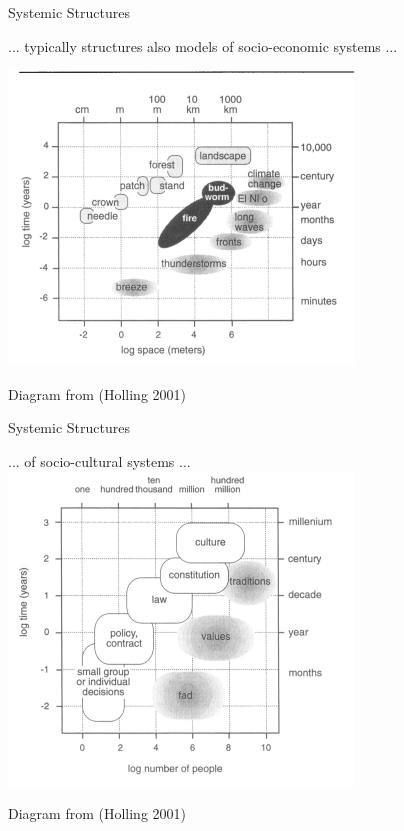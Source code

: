 \documentclass{beamer}
\begin{document}
\begin{frame}{Systemic Structures}

  ... typically structures also models of socio-economic systems ...
  \begin{center}
    \includegraphics[width=.6\textwidth]{Bilder/Holling-1.png}

    Diagram from (Holling 2001)
  \end{center}
\end{frame}

\begin{frame}{Systemic Structures}
  \begin{center}

    ... of socio-cultural systems ... 
    \includegraphics[width=.75\textwidth]{Bilder/Holling-2.png}

    Diagram from (Holling 2001)
  \end{center}
\end{frame}
\end{document}
